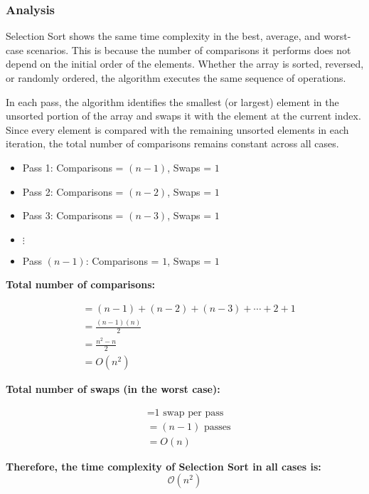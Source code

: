 \subsubsection{Analysis}

Selection Sort shows the same time complexity in the best, average, and worst-case scenarios. This is because the number of comparisons it performs does not depend on the initial order of the elements. Whether the array is sorted, reversed, or randomly ordered, the algorithm executes the same sequence of operations.

In each pass, the algorithm identifies the smallest (or largest) element in the unsorted portion of the array and swaps it with the element at the current index. Since every element is compared with the remaining unsorted elements in each iteration, the total number of comparisons remains constant across all cases.

\begin{itemize}
    \item Pass 1: Comparisons = $(n - 1)$, Swaps = $1$
    \item Pass 2: Comparisons = $(n - 2)$, Swaps = $1$
    \item Pass 3: Comparisons = $(n - 3)$, Swaps = $1$
    \item[] $\vdots$
    \item Pass $(n - 1)$: Comparisons = $1$, Swaps = $1$
\end{itemize}

\textbf{Total number of comparisons:}
\begin{center}
    \begin{align*}
        &= (n - 1) + (n - 2) + (n - 3) + \cdots + 2 + 1 \\
        &= \frac{(n - 1)(n)}{2} \\
        &= \frac{n^2 - n}{2} \\
        &= \textbf{\(O(n^2)\)}
    \end{align*}
\end{center}

\textbf{Total number of swaps (in the worst case):}
\begin{center}
    \begin{align*}
        &= \text{1 swap per pass} \\
        &= (n - 1) \text{ passes} \\
        &= \textbf{\(O(n)\)}
    \end{align*}
\end{center}

\textbf{Therefore, the time complexity of Selection Sort in all cases is:}
\[
\mathcal{O}(n^2)
\]